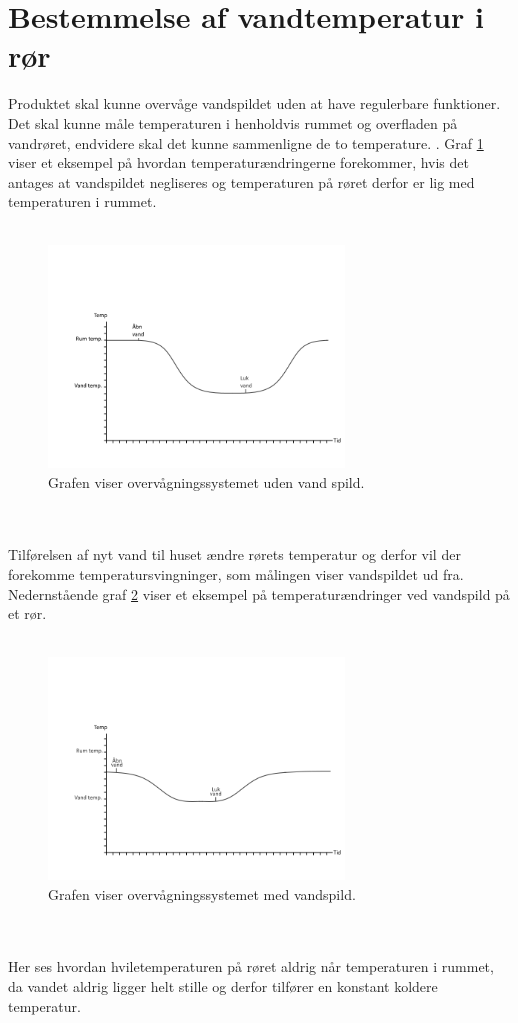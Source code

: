 \section{Bestemmelse af vandtemperatur i rør}
Produktet skal kunne overvåge vandspildet uden at have regulerbare funktioner. Det skal kunne måle temperaturen i henholdvis rummet og  overfladen på vandrøret, endvidere skal det kunne sammenligne de to temperature. .
Graf \ref{vandspild_graf_normal} viser et eksempel på hvordan temperaturændringerne forekommer, hvis det antages at vandspildet negliseres og temperaturen på røret derfor er lig med temperaturen i rummet.  
\\
\\
\begin{figure}[h!]
  \centering
  \includegraphics[width=0.7\textwidth]{figures/vandspild_graf_normal.png}
  \caption{Grafen viser overvågningssystemet uden vand spild.}
  \label{vandspild_graf_normal}
\end{figure}
\\
\\
Tilførelsen af nyt vand til huset ændre rørets temperatur og derfor vil der forekomme temperatursvingninger, som målingen viser vandspildet ud fra. Nedernstående graf \ref{vandspild_graf_spild} viser et eksempel på temperaturændringer ved vandspild på et rør.
\\
\\
\begin{figure}[h!]
  \centering
  \includegraphics[width=0.7\textwidth]{figures/vandspild_graf_spild.png}
  \caption{Grafen viser overvågningssystemet med vandspild.}
  \label{vandspild_graf_spild}
\end{figure}
\\
\\
Her ses hvordan hviletemperaturen på røret aldrig når temperaturen i rummet, da vandet aldrig ligger helt stille og derfor tilfører en konstant koldere temperatur.    